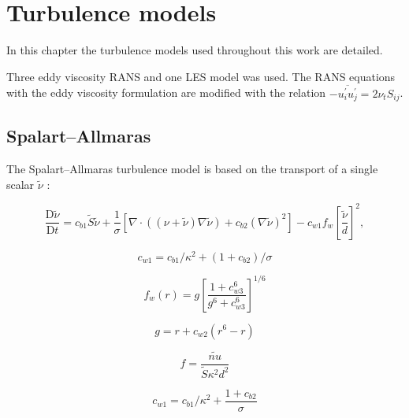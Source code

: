 \chapter{Turbulence models}
\doublespace

In this chapter the turbulence models used throughout this work are detailed.

Three eddy viscosity RANS and one LES model was used. The RANS equations with
the eddy viscosity formulation are modified with the relation
$-\overline{u_i^\prime u_j^\prime} = 2 \nu_t S_{ij}$.



\section{Spalart--Allmaras}

The Spalart--Allmaras turbulence model is based on the transport of a single
scalar $\tilde{\nu}$ \cite{Spalart1992}:

\begin{equation}
    \frac{\mathrm{D} \tilde{\nu}}{\mathrm{D} t}
    = c_{b1} \tilde{S} \tilde{\nu}
    + \frac{1}{\sigma}
    \left[
    \nabla \cdot \left( (\nu + \tilde{\nu}) \nabla \tilde{\nu} \right)
    + c_{b2} (\nabla \tilde{\nu})^2
    \right]
    - c_{w1} f_w \left[ \frac{\tilde{\nu}}{d} \right]^2,
    \label{eq:SA-nutilde}
\end{equation}

\begin{equation}
    c_{w1} = c_{b1}/\kappa^2 + (1 + c_{b2})/\sigma
\end{equation}

\begin{equation}
    f_w(r) = g \left[ \frac{1 + c_{w3}^6}{g^6 + c_{w3}^6} \right]^{1/6}
\end{equation}

\begin{equation}
    g = r + c_{w2} (r^6 - r)
\end{equation}

\begin{equation}
    f = \frac{\tilde{nu}}{\tilde{S} \kappa^2 d^2}
\end{equation}

\begin{equation}
    c_{w1} = c_{b1}/\kappa^2 + \frac{1 + c_{b2}}{\sigma}
\end{equation}

